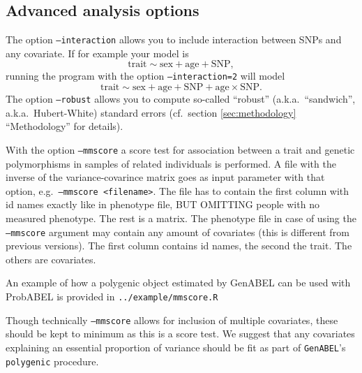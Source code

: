 \documentclass[12pt,a4paper]{article}
\begin{document}
\subsection{Advanced analysis options}
The option \texttt{--interaction} allows you to include interaction
between SNPs and any covariate. If for example your model is
\begin{equation*}
  \textrm{trait} \sim \textrm{sex} + \textrm{age} + \textrm{SNP},
\end{equation*}
running the program with the option \texttt{--interaction=2} will model
\begin{equation*}
  \textrm{trait} \sim \textrm{sex} + \textrm{age} + \textrm{SNP} +
  \textrm{age} \times \mathrm{SNP}.
\end{equation*}
The option \texttt{--robust} allows you to compute so-called
``robust'' (a.k.a.~``sandwich'', a.k.a.~Hubert-White) standard errors
(cf.~section \ref{sec:methodology} ``Methodology'' for details).

With the option \texttt{--mmscore} a score test for association
between a trait and genetic polymorphisms in samples of related
individuals is performed. A file with the inverse of the
variance-covarince matrix goes as input parameter with that option,
e.g.~\texttt{--mmscore <filename>}. The file has to contain the first
column with id names exactly like in phenotype file, BUT OMITTING
people with no measured phenotype. The rest is a matrix. The phenotype
file in case of using the \texttt{--mmscore} argument may contain any
amount of covariates (this is different from previous versions). The
first column contains id names, the second the trait. The others are
covariates.

An example of how a polygenic object estimated by GenABEL can be used
with ProbABEL is provided in \texttt{../example/mmscore.R}

Though technically \texttt{--mmscore} allows for inclusion of multiple
covariates, these should be kept to minimum as this is a score test. We
suggest that any covariates explaining an essential proportion of
variance should be fit as part of \texttt{GenABEL}'s
\texttt{polygenic} procedure.

\end{document}
